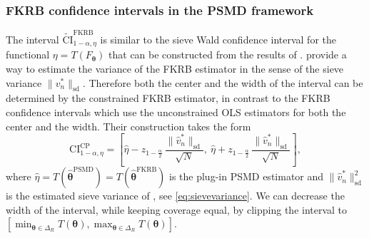 \subsubsection{FKRB confidence intervals in the PSMD framework}
The interval $\widetilde{\mathrm{CI}}^{\mathrm{FKRB}}_{1-\alpha,\eta}$ is similar to the sieve Wald confidence interval for the functional $\eta = T(F_{\bm{\theta}})$ that can be constructed from the results of \citet[][theorem~4.2]{ChenPouzo2015}.
\citet{ChenPouzo2015} provide a way to estimate the variance of the FKRB estimator in the sense of the sieve variance $\|v^*_n\|_{\mathrm{sd}}$.
Therefore both the center and the width of the interval can be determined by the constrained FKRB estimator, in contrast to the FKRB confidence intervals which use the unconstrained OLS estimators for both the center and the width.
Their construction takes the form
\begin{equation}
\label{eq:CIChenPouzo}
    \mathrm{CI}^{\mathrm{CP}}_{1-\alpha, \eta} = \left[\hat{\eta} - z_{1-\frac{\alpha}{2}}\,\frac{\|\hat{v}^*_n\|_{\mathrm{sd}}}{\sqrt{N}},\ \hat{\eta} + z_{1-\frac{\alpha}{2}}\,\frac{\|\hat{v}^*_n\|_{\mathrm{sd}}}{\sqrt{N}}\right],
\end{equation}
where $\hat{\eta} = T(\hat{\bm{\theta}}^{\mathrm{PSMD}}) = T(\hat{\bm{\theta}}^{\mathrm{FKRB}})$ is the plug-in PSMD estimator and $\|\hat{v}^*_n\|^2_{\mathrm{sd}}$ is the estimated sieve variance of \citet[][eq.~2.10]{ChenPouzo2015}, see \cref{eq:sievevariance}.
We can decrease the width of the interval, while keeping coverage equal, by clipping the interval to $[\min_{\bm{\theta}\in \Delta_R}{T(\bm{\theta})},\max_{\bm{\theta}\in \Delta_R}{T(\bm{\theta})}]$.

